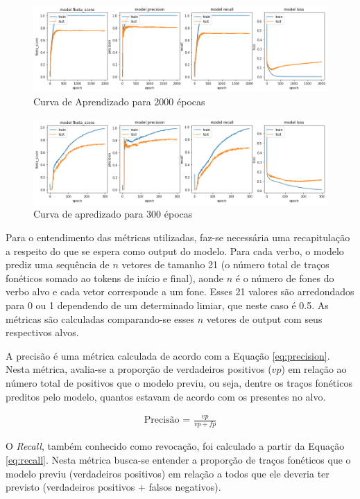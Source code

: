 \begin{figure}[H]
  \centering
  \includegraphics[width=1.0\linewidth]{img/2000_precision.png}
  \caption{Curva de Aprendizado para 2000 épocas}
  \label{fig:training2000}
\end{figure}

\begin{figure}[H]
  \centering
  \includegraphics[width=1.0\linewidth]{img/300_fbeta.png}
  \caption{Curva de apredizado para 300 épocas}
  \label{fig:training}
\end{figure}

Para o entendimento das métricas utilizadas, faz-se necessária uma recapitulação a respeito do que se espera como output do modelo. Para cada verbo, o modelo prediz uma sequência de $n$ vetores de tamanho 21 (o número total de traços fonéticos somado ao tokens de início e final), aonde $n$ é o número de fones do verbo alvo e cada vetor corresponde a um fone. Esses 21 valores são arredondados para 0 ou 1 dependendo de um determinado limiar, que neste caso é 0.5. As métricas são calculadas comparando-se esses $n$ vetores de output com seus respectivos alvos.

A precisão é uma métrica calculada de acordo com a Equação \ref{eq:precision}. Nesta métrica, avalia-se a proporção de verdadeiros positivos ($vp$) em relação ao número total de positivos que o modelo previu, ou seja, dentre os traços fonéticos preditos pelo modelo, quantos estavam de acordo com os presentes no alvo.


\begin{align}\label{eq:precision}
\text{Precisão = } \frac{vp}{vp + fp}
\end{align}

O \textit{Recall}, também conhecido como revocação, foi calculado a partir da Equação \ref{eq:recall}. Nesta métrica busca-se entender a proporção de traços fonéticos que o modelo previu (verdadeiros positivos) em relação a todos que ele deveria ter previsto (verdadeiros positivos + falsos negativos). 

